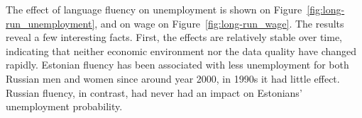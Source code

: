 \documentclass[12pt, a4paper]{article}
\begin{document}
The effect of language fluency on unemployment is shown on
Figure~\ref{fig:long-run_unemployment}, and on wage on
Figure~\ref{fig:long-run_wage}.
The results reveal a few interesting facts.  First, the effects are
relatively stable over time, indicating that neither economic
environment nor the data quality have changed rapidly.  Estonian
fluency has been associated with less unemployment for both Russian men and
women since around year 2000, in 1990s it had little effect.  Russian fluency,
in contrast, had never had an impact on Estonians' unemployment probability.
\end{document}

